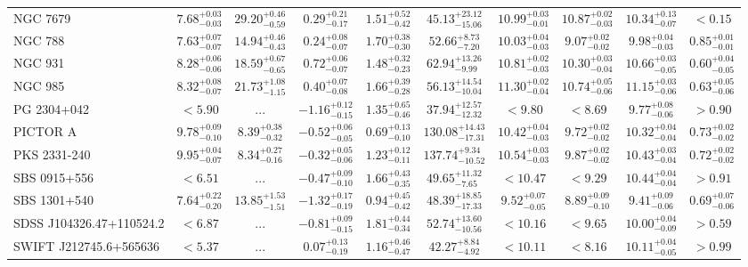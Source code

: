 \documentclass[onecolumn]{mn2e}
\begin{document}
\begin{landscape}
{\begin{center}
\begin{longtable}{lccccccccc}
NGC 7679 & $7.68_{-0.03}^{+0.03}$ & $29.20_{-0.59}^{+0.46}$ & $0.29_{-0.17}^{+0.21}$ & $1.51_{-0.42}^{+0.52}$ &$45.13_{-15.06}^{+23.12}$ & $10.99_{-0.01}^{+0.03}$ & $10.87_{-0.03}^{+0.02}$ & $10.34_{-0.07}^{+0.13}$ & $<0.15$ \\
NGC 788 & $7.63_{-0.07}^{+0.07}$ & $14.94_{-0.43}^{+0.46}$ & $0.24_{-0.07}^{+0.08}$ & $1.70_{-0.30}^{+0.38}$ &$52.66_{-7.20}^{+8.73}$ & $10.03_{-0.03}^{+0.04}$ & $9.07_{-0.02}^{+0.02}$ & $9.98_{-0.03}^{+0.04}$ & $0.85_{-0.01}^{+0.01}$ \\
NGC 931 & $8.28_{-0.06}^{+0.06}$ & $18.59_{-0.65}^{+0.67}$ & $0.72_{-0.07}^{+0.06}$ & $1.48_{-0.23}^{+0.32}$ &$62.94_{-9.99}^{+13.26}$ & $10.81_{-0.03}^{+0.02}$ & $10.30_{-0.04}^{+0.03}$ & $10.66_{-0.05}^{+0.03}$ & $0.60_{-0.05}^{+0.04}$ \\
NGC 985 & $8.32_{-0.07}^{+0.08}$ & $21.73_{-1.15}^{+1.08}$ & $0.40_{-0.08}^{+0.07}$ & $1.66_{-0.28}^{+0.39}$ &$56.13_{-10.04}^{+14.54}$ & $11.30_{-0.04}^{+0.02}$ & $10.74_{-0.06}^{+0.05}$ & $11.15_{-0.06}^{+0.03}$ & $0.63_{-0.06}^{+0.05}$ \\
PG 2304+042 & $<5.90$ & ... & $-1.16_{-0.15}^{+0.12}$ & $1.35_{-0.46}^{+0.65}$ &$37.94_{-12.32}^{+12.57}$ & $<9.80$ & $<8.69$ & $9.77_{-0.06}^{+0.08}$ & $>0.90$ \\
PICTOR A & $9.78_{-0.10}^{+0.09}$ & $8.39_{-0.32}^{+0.38}$ & $-0.52_{-0.05}^{+0.06}$ & $0.69_{-0.10}^{+0.13}$ &$130.08_{-17.31}^{+14.43}$ & $10.42_{-0.03}^{+0.04}$ & $9.72_{-0.02}^{+0.02}$ & $10.32_{-0.04}^{+0.04}$ & $0.73_{-0.02}^{+0.02}$ \\
PKS 2331-240 & $9.95_{-0.07}^{+0.04}$ & $8.34_{-0.16}^{+0.27}$ & $-0.32_{-0.06}^{+0.05}$ & $1.23_{-0.11}^{+0.12}$ &$137.74_{-10.52}^{+9.34}$ & $10.54_{-0.03}^{+0.03}$ & $9.87_{-0.02}^{+0.02}$ & $10.43_{-0.04}^{+0.03}$ & $0.72_{-0.02}^{+0.02}$ \\
SBS 0915+556 & $<6.51$ & ... & $-0.47_{-0.10}^{+0.09}$ & $1.66_{-0.35}^{+0.43}$ &$49.65_{-7.65}^{+11.32}$ & $<10.47$ & $<9.29$ & $10.44_{-0.04}^{+0.04}$ & $>0.91$ \\
SBS 1301+540 & $7.64_{-0.20}^{+0.22}$ & $13.85_{-1.51}^{+1.53}$ & $-1.32_{-0.19}^{+0.17}$ & $0.94_{-0.42}^{+0.45}$ &$48.39_{-17.33}^{+18.85}$ & $9.52_{-0.05}^{+0.07}$ & $8.89_{-0.10}^{+0.09}$ & $9.41_{-0.06}^{+0.09}$ & $0.69_{-0.06}^{+0.07}$ \\
SDSS J104326.47+110524.2 & $<6.87$ & ... & $-0.81_{-0.15}^{+0.09}$ & $1.81_{-0.34}^{+0.44}$ &$52.74_{-10.56}^{+13.60}$ & $<10.16$ & $<9.65$ & $10.00_{-0.09}^{+0.04}$ & $>0.59$ \\
SWIFT J212745.6+565636 & $<5.37$ & ... & $0.07_{-0.19}^{+0.13}$ & $1.16_{-0.47}^{+0.46}$ &$42.27_{-4.92}^{+8.84}$ & $<10.11$ & $<8.16$ & $10.11_{-0.05}^{+0.04}$ & $>0.99$ \\

\end{longtable}
\end{center}}
\end{landscape}
\end{document}
